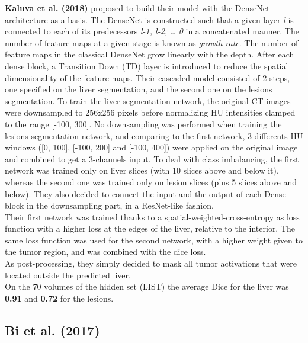 \textbf{Kaluva et al. (2018)} proposed to build their model with the
DenseNet architecture as a basis. The DenseNet is constructed such that
a given layer \emph{l} is connected to each of its predecessors
\emph{l-1, l-2, \ldots{} 0} in a concatenated manner. The number of
feature maps at a given stage is known as \emph{growth rate}. The number
of feature maps in the classical DenseNet grow linearly with the depth.
After each dense block, a Transition Down (TD) layer is introduced to
reduce the spatial dimensionality of the feature maps.
Their cascaded model consisted of 2 steps, one specified on the liver
segmentation, and the second one on the lesions segmentation.
To train the liver segmentation network, the original CT images were
downsampled to 256x256 pixels before normalizing HU intensities clamped
to the range {[}-100, 300{]}.
No downsampling was performed when training the lesions segmentation
network, and comparing to the first network, 3 differents HU windows
({[}0, 100{]}, {[}-100, 200{]} and {[}-100, 400{]}) were applied on the
original image and combined to get a 3-channels input.
To deal with class imbalancing, the first network was trained only on
liver slices (with 10 slices above and below it), whereas the second one
was trained only on lesion slices (plus 5 slices above and below).
They also decided to connect the input and the output of each Dense
block in the downsampling part, in a ResNet-like fashion.\\
Their first network was trained thanks to a
spatial-weighted-cross-entropy as loss function with a higher loss at
the edges of the liver, relative to the interior. The same loss function
was used for the second network, with a higher weight given to the tumor
region, and was combined with the dice loss.\\
As post-processing, they simply decided to mask all tumor activations
that were located outside the predicted liver.\\
On the 70 volumes of the hidden set (LIST) the average Dice for the
liver was \textbf{0.91} and \textbf{0.72} for the lesions.

\subsection{Bi et al. (2017)}\label{bi-et-al.-2017}


